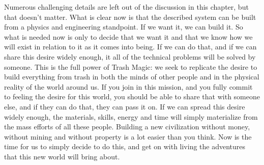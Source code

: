 Numerous challenging details are left out of the discussion in this chapter, but that doesn't matter.  What is clear now is that the described system can be built from a physics and engineering standpoint.  If we want it, we can build it.  So what is needed now is only to decide that we want it and that we know how we will exist in relation to it as it comes into being.  If we can do that, and if we can share this desire widely enough, it all of the technical problems will be solved by someone.  This is the full power of Trash Magic: we seek to replicate the desire to build everything from trash in both the minds of other people and in the physical reality of the world around us.  If you join in this mission, and you fully commit to feeling the desire for this world, you should be able to share that with someone else, and if they can do that, they can pass it on.  If we can spread this desire widely enough, the materials, skills, energy and time will simply materialize from the mass efforts of all these people.  Building a new civilization without money, without mining and without property is a lot easier than you think.  Now is the time for us to simply decide to do this, and get on with living the adventures that this new world will bring about.



